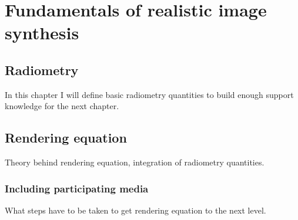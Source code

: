 \chapter{Fundamentals of realistic image synthesis}

\section{Radiometry}
In this chapter I will define basic radiometry quantities to build enough support knowledge for the next chapter. 
\section{Rendering equation}
Theory behind rendering equation, integration of radiometry quantities.
\subsection{Including participating media}
What steps have to be taken to get rendering equation to the next level.





